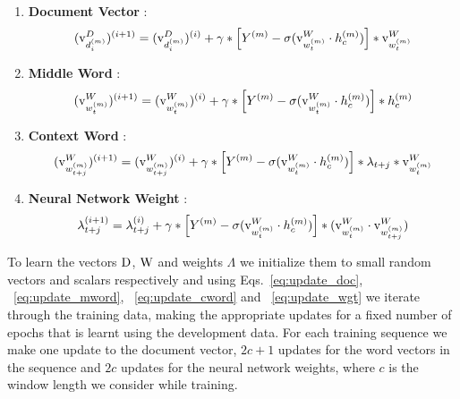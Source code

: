\begin{enumerate}
\item 
\textbf{Document Vector} : 
\begin{equation}
\label{eq:update_doc}
(\mathrm{v}^{D}_{d^{(m)}_{i}})^{(i+1)} = (\mathrm{v}^{D}_{d^{(m)}_{i}})^{(i)} + \gamma* \left[ Y^{(m)} - \sigma(\mathrm{v}^{W}_{w^{(m)}_{t}} \cdot h^{(m)}_{c})\right]* \mathrm{v}^{W}_{w^{(m)}_{t}}
\end{equation}
\item 
\textbf{Middle Word} : 
\begin{equation}
\label{eq:update_mword}
(\mathrm{v}^{W}_{w^{(m)}_{t}})^{(i+1)} = (\mathrm{v}^{W}_{w^{(m)}_{t}})^{(i)} + \gamma* \left[ Y^{(m)} - \sigma(\mathrm{v}^{W}_{w^{(m)}_{t}} \cdot h^{(m)}_{c})\right]* h^{(m)}_{c}
\end{equation}
\item 
\textbf{Context Word} : 
\begin{equation}
\label{eq:update_cword}
(\mathrm{v}^{W}_{w^{(m)}_{t+j}})^{(i+1)} = (\mathrm{v}^{W}_{w^{(m)}_{t+j}})^{(i)} + \gamma* \left[ Y^{(m)} - \sigma(\mathrm{v}^{W}_{w^{(m)}_{t}} \cdot h^{(m)}_{c})\right]* \lambda_{t+j}* \mathrm{v}^{W}_{w^{(m)}_{t}}
\end{equation}
\item 
\textbf{Neural Network Weight} : 
\begin{equation}
\label{eq:update_wgt}
\lambda_{t+j}^{(i+1)} = \lambda_{t+j}^{(i)} + \gamma* \left[ Y^{(m)} - \sigma(\mathrm{v}^{W}_{w^{(m)}_{t}} \cdot h^{(m)}_{c})\right]* (\mathrm{v}^{W}_{w^{(m)}_{t}} \cdot \mathrm{v}^{W}_{w^{(m)}_{t+j}})
\end{equation}
\end{enumerate}
To learn the vectors $\mathrm{D}$, $\mathrm{W}$ and weights $\Lambda$ we initialize them to small random vectors and scalars respectively and using Eqs.~\ref{eq:update_doc}, ~\ref{eq:update_mword}, ~\ref{eq:update_cword} and ~\ref{eq:update_wgt} we iterate through the training data, making the appropriate updates for a fixed number of epochs that is learnt using the development data. For each training sequence we make one update to the document vector, $2c+1$ updates for the word vectors in the sequence and $2c$ updates for the neural network weights, where $c$ is the window length we consider while training.



